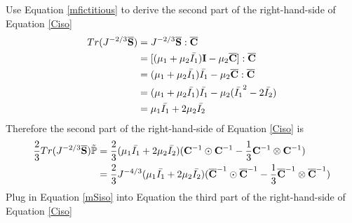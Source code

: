 Use Equation \ref{mfictitious} to derive the second part of the right-hand-side of Equation \ref{Ciso}
\begin{equation}
\begin{split}
Tr(J^{-2/3}\overline{\bold{S}}) &= J^{-2/3}{\overline{\bold{S}}} : {\overline{\bold{C}}} \\
&= [(\mu_1 + \mu_2{\bar{I_1}})\bold{I} - \mu_2{\overline{\bold{C}}}] : \overline{\bold{C}} \\
&= (\mu_1 + \mu_2\bar{I_1})\bar{I_1} - \mu_2{\overline{\bold{C}}} : {\overline{\bold{C}}} \\
&= (\mu_1 + \mu_2\bar{I_1})\bar{I_1} - \mu_2({\bar{I_1}}^2 - 2\bar{I_2}) \\
&= \mu_1\bar{I_1} + 2\mu_2\bar{I_2}
\end{split}
\end{equation}
Therefore the second part of the right-hand-side of Equation \ref{Ciso} is
\begin{equation} \label{part2}
\begin{split}
\frac{2}{3}Tr(J^{-2/3}\overline{\bold{S}})\tilde{\mathbb{P}} &= \frac{2}{3}(\mu_1\bar{I_1} + 2\mu_2\bar{I_2})({\bold{C}}^{-1} \odot {\bold{C}}^{-1} - \frac{1}{3}{\bold{C}}^{-1} \otimes {\bold{C}}^{-1}) \\
&= \frac{2}{3}J^{-4/3}(\mu_1\bar{I_1} + 2\mu_2\bar{I_2})({\overline{\bold{C}}}^{-1} \odot {{\overline{\bold{C}}}}^{-1} - \frac{1}{3}{{\overline{\bold{C}}}}^{-1} \otimes {\overline{{\bold{C}}}}^{-1})
\end{split}
\end{equation}
Plug in Equation \ref{mSiso} into Equation the third part of the right-hand-side of Equation \ref{Ciso}
